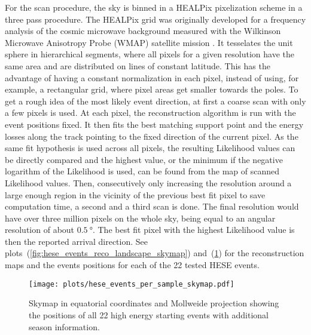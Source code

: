 For the scan procedure, the sky is binned in a HEALPix \cite{Gorski:2004by} pixelization scheme in a three pass procedure.
The HEALPix grid was originally developed for a frequency analysis of the cosmic microwave background measured with the Wilkinson Microwave Anisotropy Probe (WMAP) satellite mission \cite{Jarosik:2010iu}.
It tesselates the unit sphere in hierarchical segments, where all pixels for a given resolution have the same area and are distributed on lines of constant latitude.
This has the advantage of having a constant normalization in each pixel, instead of using, for example, a rectangular grid, where pixel areas get smaller towards the poles.
To get a rough idea of the most likely event direction, at first a coarse scan with only a few pixels is used.
At each pixel, the reconstruction algorithm is run with the event positions fixed.
It then fits the best matching support point and the energy losses along the track pointing to the fixed direction of the current pixel.
As the same fit hypothesis is used across all pixels, the resulting Likelihood values can be directly compared and the highest value, or the minimum if the negative logarithm of the Likelihood is used, can be found from the map of scanned Likelihood values.
Then, consecutively only increasing the resolution around a large enough region in the vicinity of the previous best fit pixel to save computation time, a second and a third scan is done.
The final resolution would have over three million pixels on the whole sky, being equal to an angular resolution of about $\SI{0.5}{\degree}$.
The best fit pixel with the highest Likelihood value is then the reported arrival direction.
See plots~(\ref{fig:hese_events_reco_landscape_skymap}) and~(\ref{fig:hese_events_per_sample_skymap}) for the reconstruction maps and the events positions for each of the 22 tested HESE events.

\begin{figure}[htbp]
  \centering
  \texttt{[image: plots/hese\_events\_per\_sample\_skymap.pdf]}
  \caption[Skymap of all 22 HESE positions with season information]{
    Skymap in equatorial coordinates and Mollweide projection showing the positions of all 22 high energy starting events with additional season information.
  }
  \label{fig:hese_events_per_sample_skymap}
\end{figure}

